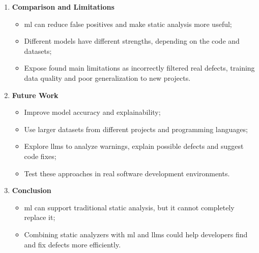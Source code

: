 \begin{enumerate}
    \item \textbf{Comparison and Limitations}
    \begin{itemize}
        \item \gls{ml} can reduce false positives and make static analysis more useful;
        \item Different models have different strengths, depending on the code and datasets;
        \item Expose found main limitations as incorrectly filtered real defects, training data quality and poor generalization to new projects.
    \end{itemize}

    \item \textbf{Future Work}
    \begin{itemize}
        \item Improve model accuracy and explainability;
        \item Use larger datasets from different projects and programming languages;
        \item Explore \gls{llms} to analyze warnings, explain possible defects and suggest code fixes;
        \item Test these approaches in real software development environments.
    \end{itemize}

    \item \textbf{Conclusion}
    \begin{itemize}
        \item \gls{ml} can support traditional static analysis, but it cannot completely replace it;
        \item Combining static analyzers with \gls{ml} and \gls{llms} could help developers find and fix defects more efficiently.
    \end{itemize}
\end{enumerate}

\newpage